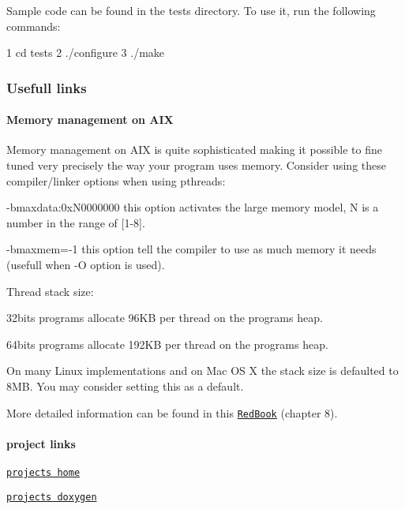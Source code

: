 Sample code can be found in the {\ttfamily tests} directory. To use it, run the following commands\+: 
\begin{DoxyCode}
1 cd tests
2 ./configure
3 ./make
\end{DoxyCode}


\subsubsection*{Usefull links}

\paragraph*{Memory management on A\+IX}

Memory management on A\+IX is quite sophisticated making it possible to fine tuned very precisely the way your program uses memory. Consider using these compiler/linker options when using pthreads\+:
\begin{DoxyItemize}
\item -\/bmaxdata\+:0x\+N0000000 this option activates the large memory model, N is a number in the range of \mbox{[}1-\/8\mbox{]}.
\item -\/bmaxmem=-\/1 this option tell the compiler to use as much memory it needs (usefull when -\/O option is used).
\end{DoxyItemize}

Thread stack size\+:
\begin{DoxyItemize}
\item 32bits programs allocate 96\+KB per thread on the program\textquotesingle{}s heap.
\item 64bits programs allocate 192\+KB per thread on the program\textquotesingle{}s heap.
\end{DoxyItemize}

On many Linux implementations and on Mac OS X the stack size is defaulted to 8\+MB. You may consider setting this as a default.

More detailed information can be found in this \href{http://www.redbooks.ibm.com/redbooks/pdfs/sg245674.pdf}{\tt Red\+Book} (chapter 8).

\paragraph*{project links}


\begin{DoxyItemize}
\item \href{https://github.com/HerbertKoelman/cpp-pthread}{\tt project\textquotesingle{}s home}
\item \href{http://herbertkoelman.github.io/cpp-pthread/doc/html/}{\tt project\textquotesingle{}s doxygen}
\end{DoxyItemize}


